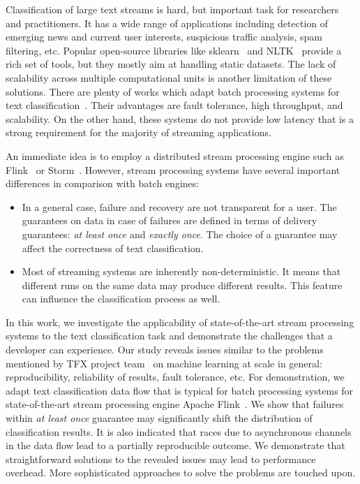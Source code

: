 \label {fs-short-intro}

Classification of large text streams is hard, but important task for researchers and practitioners. It has a wide range of applications including detection of emerging news and current user interests, suspicious traffic analysis, spam filtering, etc. Popular open-source libraries like sklearn~\cite{sklearn_api} and NLTK~\cite{bird2009natural} provide a rich set of tools, but they mostly aim at handling static datasets. The lack of scalability across multiple computational units is another limitation of these solutions. There are plenty of works which adapt batch processing systems for text classification~\cite{semberecki2016distributed, svyatkovskiy2016large, baltas2016apache}. Their advantages are fault tolerance, high throughput, and scalability. On the other hand, these systems do not provide low latency that is a strong requirement for the majority of streaming applications.

An immediate idea is to employ a distributed stream processing engine such as Flink~\cite{Carbone:2017:SMA:3137765.3137777} or Storm~\cite{apache:storm}. However, stream processing systems have several important differences in comparison with batch engines: 

\begin{itemize}
    \item In a general case, failure and recovery are not transparent for a user. The guarantees on data in case of failures are defined in terms of delivery guarantees: {\em at least once} and {\em exactly once}. The choice of a guarantee may affect the correctness of text classification.
    \item Most of streaming systems are inherently non-deterministic. It means that different runs on the same data may produce different results. This feature can influence the classification process as well.
\end{itemize}

In this work, we investigate the applicability of state-of-the-art stream processing systems to the text classification task and demonstrate the challenges that a developer can experience. Our study reveals issues similar to the problems mentioned by TFX project team~\cite{Baylor:2017:TTP:3097983.3098021} on machine learning at scale in general: reproducibility, reliability of results, fault tolerance, etc. For demonstration, we adapt text classification data flow that is typical for batch processing systems for state-of-the-art stream processing engine Apache Flink~\cite{Carbone:2017:SMA:3137765.3137777}. We show that failures within {\em at least once} guarantee may significantly shift the distribution of classification results. It is also indicated that races due to asynchronous channels in the data flow lead to a partially reproducible outcome. We demonstrate that straightforward solutions to the revealed issues may lead to performance overhead. More sophisticated approaches to solve the problems are touched upon.

